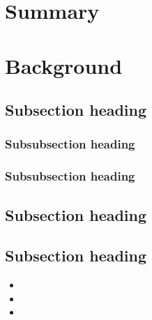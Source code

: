 \documentclass[a4paper,12pt]{article}
\begin{document}
\tableofcontents

\newpage



\section*{Summary}

\label{sec:summary}  %




\section{Background}


\subsection{Subsection heading}

\subsubsection*{Subsubsection heading}

\subsubsection*{Subsubsection heading}


\subsection{Subsection heading}




\subsection{Subsection heading}

\begin{itemize}
\item 
\item 
\item 
\end{itemize}
\end{document}
